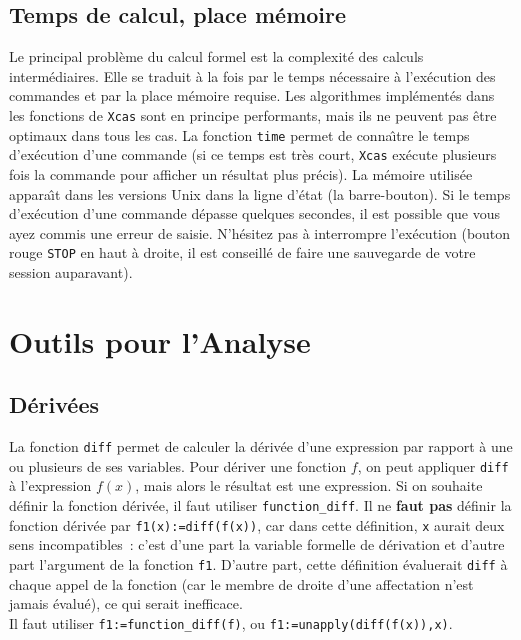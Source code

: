 \documentclass{article}
\begin{document}
\begin{giacjshere}
\subsection{Temps de calcul, place m\'emoire}
%
Le principal probl\`eme du calcul formel est la complexit\'e des 
calculs interm\'ediaires. Elle se traduit \`a la fois par le temps
n\'ecessaire \`a l'ex\'ecution des commandes et par la place m\'emoire
requise. Les algorithmes impl\'ement\'es dans les fonctions
de {\tt Xcas} sont en principe performants, mais ils ne
peuvent pas \^etre optimaux dans tous les cas. La fonction \verb|time| 
permet de conna\^\i tre le temps d'ex\'ecution d'une commande (si ce temps
est tr\`es court, {\tt Xcas} ex\'ecute plusieurs fois la commande pour
afficher un r\'esultat plus pr\'ecis). La m\'emoire utilis\'ee 
appara\^\i t dans les versions Unix dans la ligne d'\'etat
(la barre-bouton). Si le temps d'ex\'ecution d'une
commande d\'epasse quelques secondes, il est possible que vous ayez
commis une erreur de saisie. N'h\'esitez pas \`a interrompre
l'ex\'ecution (bouton rouge \verb|STOP| en haut \`a droite, il est
conseill\'e de faire une sauvegarde de votre session auparavant).

\section{Outils pour l'Analyse}
%
\subsection{D\'eriv\'ees}
%
La fonction \verb|diff| permet de calculer la d\'eriv\'ee d'une
expression par rapport \`a une ou plusieurs de ses variables. Pour
d\'eriver une fonction $f$, 
on peut appliquer \verb|diff| \`a l'expression $f(x)$, mais alors le
r\'esultat est une expression. Si on souhaite d\'efinir la fonction
d\'eriv\'ee, il faut utiliser \verb|function_diff|.
Il ne {\bf faut pas} d\'efinir la fonction d\'eriv\'ee par
\verb|f1(x):=diff(f(x))|, car dans cette d\'efinition, \verb|x| aurait 
deux sens incompatibles~: c'est d'une part la
variable formelle de d\'erivation et d'autre part l'argument
de la fonction \verb|f1|. D'autre part, cette d\'efinition
\'evaluerait \verb|diff| \`a chaque appel de la fonction (car
le membre de droite d'une affectation n'est jamais \'evalu\'e), ce 
qui serait inefficace.\\ Il faut utiliser
\verb|f1:=function_diff(f)|, 
ou
\verb|f1:=unapply(diff(f(x)),x)|.


\end{giacjshere}
\end{document}
